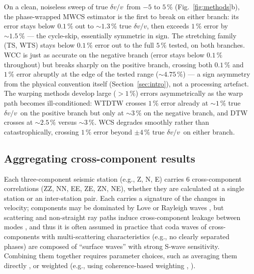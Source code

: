 \documentclass[
  referee]{gji}
\providecommand{\dvv}{\ensuremath{\delta v/v}}
\begin{document}
On a clean, noiseless sweep of true \dvv~from \(-5\) to \(5\,\%\)
(Fig.~\ref{fig:methods}b), the phase-wrapped MWCS estimator is the first
to break on either branch: its error stays below \(0.1\,\%\) out to
\(\sim\!1.3\,\%\) true \dvv, then exceeds \(1\,\%\) error by
\(\sim\!1.5\,\%\) --- the cycle-skip, essentially symmetric in sign. The
stretching family (TS, WTS) stays below \(0.1\,\%\) error out to the
full \(5\,\%\) tested, on both branches. WCC is just as accurate on the
negative branch (error stays below \(0.1\,\%\) throughout) but breaks
sharply on the positive branch, crossing both \(0.1\,\%\) and \(1\,\%\)
error abruptly at the edge of the tested range (\(\sim\!4.75\,\%\)) ---
a sign asymmetry from the physical convention itself
(Section~\ref{sec:intro}), not a processing artefact. The warping
methods develop large (\(>\!1\,\%\)) errors asymmetrically as the warp
path becomes ill-conditioned: WTDTW crosses \(1\,\%\) error already at
\(\sim\!1\,\%\) true \dvv~on the positive branch but only at
\(\sim\!3\,\%\) on the negative branch, and DTW crosses at
\(\sim\!2.5\,\%\) versus \(\sim\!3\,\%\). WCS degrades smoothly rather
than catastrophically, crossing \(1\,\%\) error beyond \(\pm4\,\%\) true
\dvv~on either branch.

\subsection{Aggregating cross-component results}\label{sec:aggregation}

Each three-component seismic station (e.g., Z, N, E) carries 6
cross-component correlations (ZZ, NN, EE, ZE, ZN, NE), whether they are
calculated at a single station or an inter-station pair. Each carries a
signature of the changes in velocity; components may be dominated by
Love or Rayleigh waves \citep{Lin2008, Stehly2006}, but scattering and
non-straight ray paths induce cross-component leakage between modes
\citep{Hennino2001, Margerin2019}, and thus it is often assumed in
practice that coda waves of cross-components with multi-scattering
characteristics (e.g., no clearly separated phases) are composed of
``surface waves'' with strong S-wave sensitivity. Combining them
together requires parameter choices, such as averaging them directly
\citep{Liu2014}, or weighted (e.g., using coherence-based weighting
\citet{Hobiger2012}, \citet{DePlaen2016}).
\end{document}
